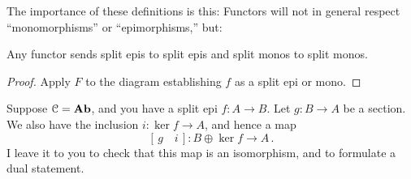 The importance of these definitions is this: Functors will not in general
respect ``monomorphisms'' or ``epimorphisms,'' but:
\begin{lemma}
Any functor sends split epis to split epis and split monos to split monos.
\end{lemma}
\begin{proof}
Apply $F$ to the diagram establishing $f$ as a split epi or mono.
\end{proof}
\begin{example}
Suppose $\mathcal C=\mathbf{Ab}$, and you have a split epi $f:A\to B$. Let $g:B\to A$ be a section. We also have the inclusion $i:\ker f\to A$, and hence a map
\[
[\,g\quad i\,]:B\oplus\ker f\to A\,.
\]
I leave it to you to check that this map is an isomorphism, and to formulate a
dual statement.
\end{example}

